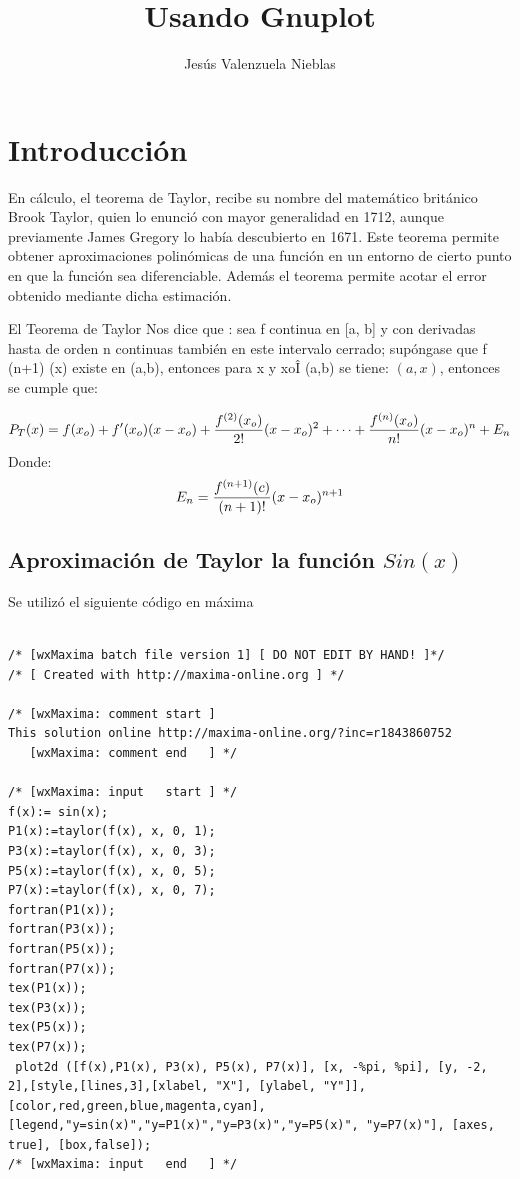 \documentclass[12pt]{article}
\title{Usando Gnuplot}
\author{Jesús Valenzuela Nieblas}
\date{}
\begin{document}
\maketitle
\section{Introducción}
En cálculo, el teorema de Taylor, recibe su nombre del matemático británico Brook Taylor, quien lo enunció con mayor generalidad en 1712, aunque previamente James Gregory lo había descubierto en 1671. Este teorema permite obtener aproximaciones polinómicas de una función en un entorno de cierto punto en que la función sea diferenciable. Además el teorema permite acotar el error obtenido mediante dicha estimación.

El Teorema de Taylor Nos dice que : sea f continua en [a, b] y con derivadas hasta de orden n continuas también en este intervalo cerrado; supóngase que f (n+1) (x) existe en (a,b), entonces para x y xoÎ (a,b) se tiene: $(a,x)$, entonces se cumple que:

$$ P_T(x)= f(x_o)+f'(x_o)(x-x_o)+ {f^{(2)}(x_o)\over 2!}(x-x_o)^2+\cdots+{f^{(n)}(x_o)\over n!}(x-x_o)^n+E_n $$
Donde:
$$ E_n={f^{(n+1)}(c)\over (n+1) !}(x-x_o)^{n+1} $$




\subsection{Aproximación de Taylor la función $Sin(x)$}
Se utilizó el siguiente código en máxima

\begin{verbatim}

/* [wxMaxima batch file version 1] [ DO NOT EDIT BY HAND! ]*/
/* [ Created with http://maxima-online.org ] */

/* [wxMaxima: comment start ]
This solution online http://maxima-online.org/?inc=r1843860752
   [wxMaxima: comment end   ] */

/* [wxMaxima: input   start ] */
f(x):= sin(x);
P1(x):=taylor(f(x), x, 0, 1);
P3(x):=taylor(f(x), x, 0, 3);
P5(x):=taylor(f(x), x, 0, 5);
P7(x):=taylor(f(x), x, 0, 7);
fortran(P1(x));
fortran(P3(x));
fortran(P5(x));
fortran(P7(x));
tex(P1(x));
tex(P3(x));
tex(P5(x));
tex(P7(x));
 plot2d ([f(x),P1(x), P3(x), P5(x), P7(x)], [x, -%pi, %pi], [y, -2, 2],[style,[lines,3],[xlabel, "X"], [ylabel, "Y"]], [color,red,green,blue,magenta,cyan],  [legend,"y=sin(x)","y=P1(x)","y=P3(x)","y=P5(x)", "y=P7(x)"], [axes, true], [box,false]);
/* [wxMaxima: input   end   ] */
\end{verbatim}
\end{document}
